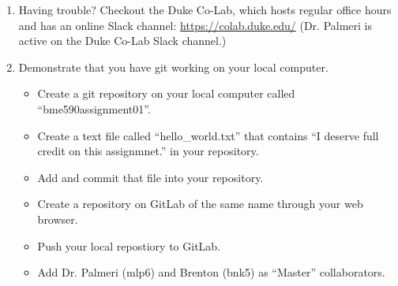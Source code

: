 \begin{enumerate}
\item Having trouble?  Checkout the Duke Co-Lab, which hosts regular office hours and has an online Slack channel: \url{https://colab.duke.edu/}  (Dr. Palmeri is active on the Duke Co-Lab Slack channel.)

\item Demonstrate that you have git working on your local computer.
\begin{itemize}
\item Create a git repository on your local computer called ``bme590assignment01''.
\item Create a text file called ``hello\_world.txt'' that contains ``I deserve full credit on this assignmnet.'' in your repository.
\item Add and commit that file into your repository.
\item Create a repository on GitLab of the same name through your web browser.
\item Push your local repostiory to GitLab.
\item Add Dr. Palmeri (mlp6) and Brenton (bnk5) as ``Master'' collaborators.
\end{itemize}

\end{enumerate}


